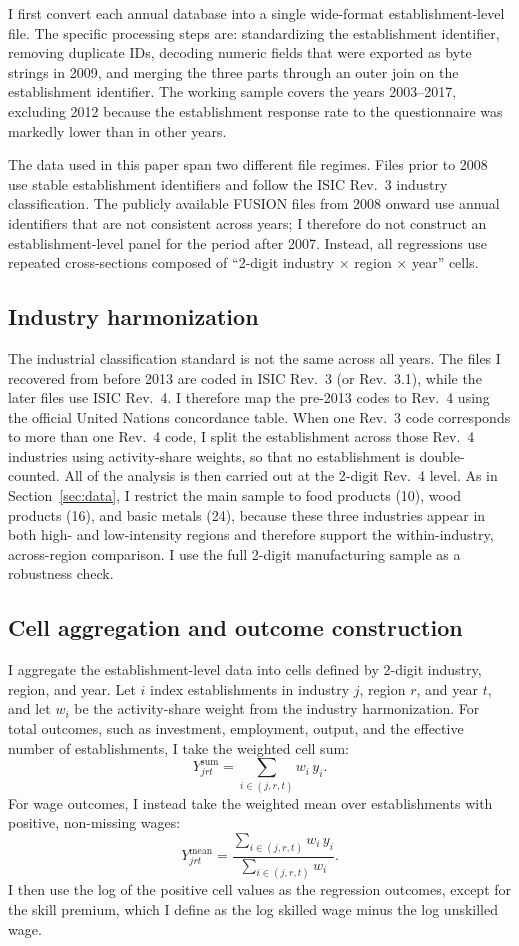 \documentclass[12pt]{article}
\begin{document}
I first convert each annual database into a single wide-format establishment-level file. The specific
processing steps are: standardizing the establishment identifier, removing duplicate IDs, decoding numeric
fields that were exported as byte strings in 2009, and merging the three parts through an outer join on the
establishment identifier. The working sample covers the years 2003--2017, excluding 2012 because the
establishment response rate to the questionnaire was markedly lower than in other years.

The data used in this paper span two different file regimes. Files prior to 2008 use stable establishment
identifiers and follow the ISIC Rev.\ 3 industry classification. The publicly available FUSION files from
2008 onward use annual identifiers that are not consistent across years; I therefore do not construct an
establishment-level panel for the period after 2007. Instead, all regressions use repeated cross-sections
composed of ``2-digit industry $\times$ region $\times$ year'' cells.

\subsection{Industry harmonization}
The industrial classification standard is not the same across all years. The files I recovered from before
2013 are coded in ISIC Rev.\ 3 (or Rev.\ 3.1), while the later files use ISIC Rev.\ 4. I therefore map the
pre-2013 codes to Rev.\ 4 using the official United Nations concordance table. When one Rev.\ 3 code
corresponds to more than one Rev.\ 4 code, I split the establishment across those Rev.\ 4 industries using
activity-share weights, so that no establishment is double-counted. All of the analysis is then carried out
at the 2-digit Rev.\ 4 level. As in Section~\ref{sec:data}, I restrict the main sample to food products
(10), wood products (16), and basic metals (24), because these three industries appear in both high- and
low-intensity regions and therefore support the within-industry, across-region comparison. I use the full
2-digit manufacturing sample as a robustness check.

\subsection{Cell aggregation and outcome construction}
I aggregate the establishment-level data into cells defined by 2-digit industry, region, and year. Let $i$
index establishments in industry $j$, region $r$, and year $t$, and let $w_i$ be the activity-share weight
from the industry harmonization. For total outcomes, such as investment, employment, output, and the
effective number of establishments, I take the weighted cell sum:
\[ Y^{\mathrm{sum}}_{jrt} = \sum_{i \in (j,r,t)} w_i\, y_i. \]
For wage outcomes, I instead take the weighted mean over establishments with positive, non-missing wages:
\[ Y^{\mathrm{mean}}_{jrt} = \frac{\sum_{i \in (j,r,t)} w_i\, y_i}{\sum_{i \in (j,r,t)} w_i}. \]
I then use the log of the positive cell values as the regression outcomes, except for the skill premium,
which I define as the log skilled wage minus the log unskilled wage.
\end{document}
